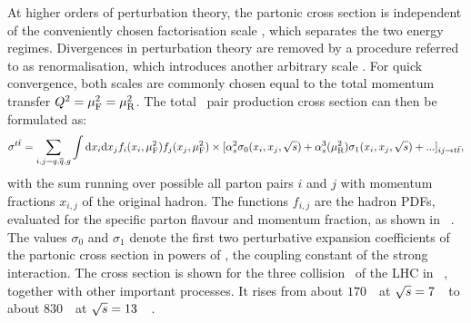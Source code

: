 %
%
At higher orders of perturbation theory, the partonic cross section is independent of the conveniently chosen factorisation scale \muf, which separates the two energy regimes. Divergences in perturbation theory are removed by a procedure referred to as renormalisation, which introduces another arbitrary scale \mur. For quick convergence, both scales are commonly chosen equal to the total momentum transfer $Q^2=\mu_\mathrm{F}^2=\mu_\mathrm{R}^2$. The total \tquark\ pair production cross section can then be formulated as:
%
\[
\sigma^{t\bar{t}}=
\sum_{i,j=q,\overline{q},g}\int \mathrm{d}x_{i} \mathrm{d}x_{j} f_{i}(x_{i},\mu_\mathrm{F}^2) f_{j}(x_{j},\mu_\mathrm{F}^2) 
\times 
[\alpha_{s}^2\sigma_0 (x_{i},x_{j},{\sqrt{s}}) + \alpha_{s}^3(\mu_\mathrm{R}^2)\sigma_1 (x_{i},x_{j},{\sqrt{s}})+ ...]_{{ij} \rightarrow t\bar{t}},
\]
%
with the sum running over possible all parton pairs $i$ and $j$ with momentum fractions $x_{i,j}$ of the original hadron. The functions $f_{i,j}$ are the hadron \glspl{PDF}, evaluated for the specific parton flavour and momentum fraction, as shown in \fig~. The values $\sigma_{0}$ and $\sigma_{1}$ denote the first two perturbative expansion coefficients of the partonic cross section in powers of \alphas, the coupling constant of the strong interaction. The cross section is shown for the three \pp collision \cmes\ of the \gls{LHC} in \fig~, together with other important processes. It rises from about $170$~\pb\ at ${\sqrt{s}}=7$~\TeV\ to about $830$~\pb\ at ${\sqrt{s}}=13$~\TeV~\cite{Czakon:2013goa}.%

